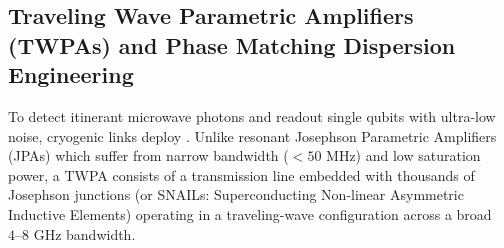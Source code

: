 \subsection{Traveling Wave Parametric Amplifiers (TWPAs) and Phase Matching Dispersion Engineering}
\label{sec:twpa_physics}

To detect itinerant microwave photons and readout single qubits with ultra-low noise, cryogenic links deploy . Unlike resonant Josephson Parametric Amplifiers (JPAs) which suffer from narrow bandwidth ($< 50\text{ MHz}$) and low saturation power, a TWPA consists of a transmission line embedded with thousands of Josephson junctions (or SNAILs: Superconducting Non-linear Asymmetric Inductive Elements) operating in a traveling-wave configuration across a broad $4\text{--}8\text{ GHz}$ bandwidth.

